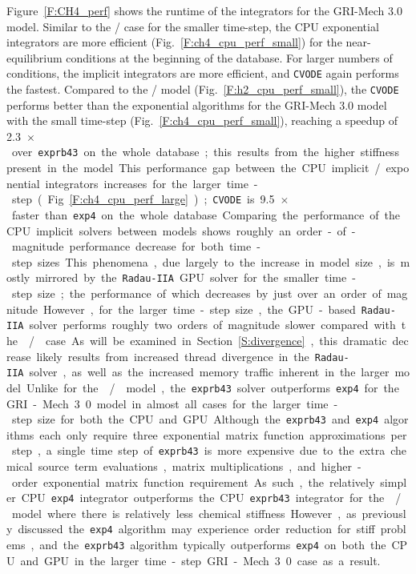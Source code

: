 \documentclass[preprint]{elsarticle}
\begin{document}
Figure~\ref{F:CH4_perf} shows the runtime of the integrators for the GRI-Mech 3.0 model.
Similar to the \slash{} case for the smaller time-step, the CPU exponential integrators are more efficient (Fig.~\ref{F:ch4_cpu_perf_small}) for the near-equilibrium conditions at the beginning of the database.
For larger numbers of conditions, the implicit integrators are more efficient, and \texttt{CVODE} again performs the fastest.
Compared to the \slash{} model (Fig.~\ref{F:h2_cpu_perf_small}), the \texttt{CVODE} performs better than the exponential algorithms for the GRI-Mech 3.0 model with the small time-step (Fig.~\ref{F:ch4_cpu_perf_small}), reaching a speedup of \SI{2.3}{$\times$} over \texttt{exprb43} on the whole database; this results from the higher stiffness present in the model.
This performance gap between the CPU implicit\slash exponential integrators increases for the larger time-step (Fig.~\ref{F:ch4_cpu_perf_large}); \texttt{CVODE} is \SI{9.5}{$\times$} faster than \texttt{exp4} on the whole database.
Comparing the performance of the CPU implicit solvers between models shows roughly an order-of-magnitude performance decrease for both time-step sizes.
This phenomena, due largely to the increase in model size, is mostly mirrored by the \texttt{Radau-IIA} GPU solver for the smaller time-step size; the performance of which decreases by just over an order of magnitude.
However, for the larger time-step size, the GPU-based \texttt{Radau-IIA} solver performs roughly two orders of magnitude slower compared with the \slash{} case.
As will be examined in Section~\ref{S:divergence}, this dramatic decrease likely results from increased thread divergence in the \texttt{Radau-IIA} solver, as well as the increased memory traffic inherent in the larger model.

Unlike for the \slash{} model, the \texttt{exprb43} solver outperforms \texttt{exp4} for the GRI-Mech 3.0 model in almost all cases for the larger time-step size for both the CPU and GPU.
Although the \texttt{exprb43} and \texttt{exp4} algorithms each only require three exponential matrix function approximations per step, a single time step of \texttt{exprb43} is more expensive due to the extra chemical source term evaluations, matrix multiplications, and higher-order exponential matrix function requirement.
As such, the relatively simpler CPU \texttt{exp4} integrator outperforms the CPU \texttt{exprb43} integrator for the \slash{} model where there is relatively less chemical stiffness.
However, as previously discussed the \texttt{exp4} algorithm may experience order reduction for stiff problems, and the \texttt{exprb43} algorithm typically outperforms \texttt{exp4} on both the CPU and GPU in the larger time-step GRI-Mech 3.0 case as a result.
\end{document}
